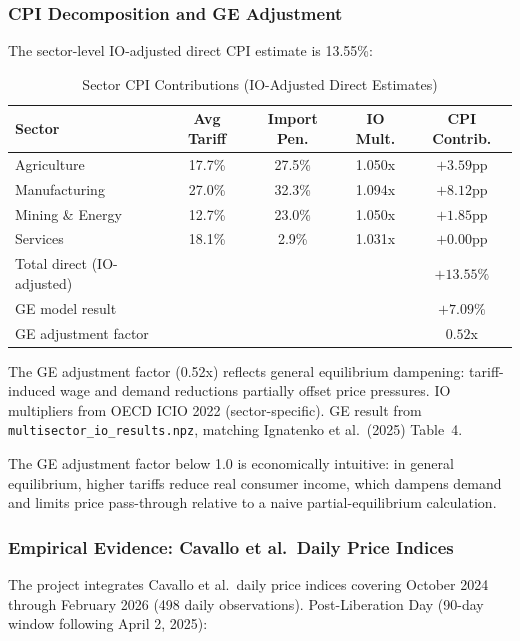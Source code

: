 \documentclass[12pt]{article}
\begin{document}
\subsubsection{CPI Decomposition and GE Adjustment}

The sector-level IO-adjusted direct CPI estimate is 13.55\%:

\begin{table}[H]
\centering
\caption{Sector CPI Contributions (IO-Adjusted Direct Estimates)}
\label{tab:cpi_decomp}
\begin{tabular}{lcccc}
\toprule
Sector & Avg Tariff & Import Pen. & IO Mult. & CPI Contrib. \\
\midrule
Agriculture       & 17.7\% & 27.5\% & 1.050x & $+3.59$pp \\
Manufacturing     & 27.0\% & 32.3\% & 1.094x & $+8.12$pp \\
Mining \& Energy  & 12.7\% & 23.0\% & 1.050x & $+1.85$pp \\
Services          & 18.1\% &  2.9\% & 1.031x & $+0.00$pp \\
\midrule
Total direct (IO-adjusted) & & & & $+13.55\%$ \\
GE model result & & & & $+7.09\%$ \\
GE adjustment factor & & & & $0.52$x \\
\bottomrule
\end{tabular}
\begin{tablenotes}
\small
\item The GE adjustment factor (0.52x) reflects general equilibrium dampening:
tariff-induced wage and demand reductions partially offset price pressures.
IO multipliers from OECD ICIO 2022 (sector-specific).
GE result from \texttt{multisector\_io\_results.npz}, matching Ignatenko et al.\ (2025) Table~4.
\end{tablenotes}
\end{table}

The GE adjustment factor below 1.0 is economically intuitive: in general
equilibrium, higher tariffs reduce real consumer income, which dampens demand
and limits price pass-through relative to a naive partial-equilibrium calculation.

\subsubsection{Empirical Evidence: Cavallo et al.\ Daily Price Indices}

The project integrates Cavallo et al.\ daily price indices covering October
2024 through February 2026 (498 daily observations). Post-Liberation Day
(90-day window following April 2, 2025):
\end{document}
